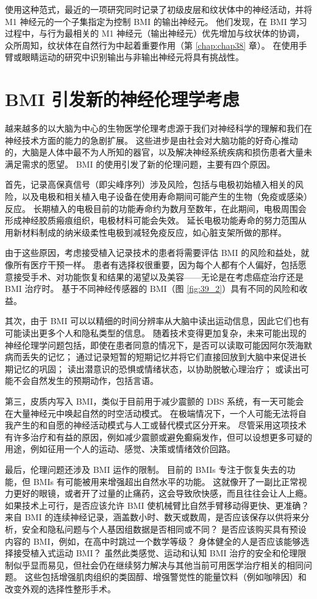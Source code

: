使用这种范式，最近的一项研究同时记录了初级皮层和纹状体中的神经活动，并将 M1 神经元的一个子集指定为控制 BMI 的输出神经元。 
他们发现，在 BMI 学习过程中，与行为最相关的 M1 神经元（输出神经元）优先增加与纹状体的协调，众所周知，纹状体在自然行为中起着重要作用（第 \ref{chap:chap38} 章）。 
在使用手臂或眼睛运动的研究中识别输出与非输出神经元将具有挑战性。


\section{BMI 引发新的神经伦理学考虑}

越来越多的以大脑为中心的生物医学伦理考虑源于我们对神经科学的理解和我们在神经技术方面的能力的急剧扩展。
这些进步是由社会对大脑功能的好奇心推动的，大脑是人体中最不为人所知的器官，以及解决神经系统疾病和损伤患者大量未满足需求的愿望。
BMI 的使用引发了新的伦理问题，主要有四个原因。


首先，记录高保真信号（即尖峰序列）涉及风险，包括与电极初始植入相关的风险，以及电极和相关植入电子设备在使用寿命期间可能产生的生物（免疫或感染）反应。
长期植入的电极目前的功能寿命约为数月至数年，在此期间，电极周围会形成神经胶质瘢痕组织，电极材料可能会失效。
延长电极功能寿命的努力范围从用新材料制成的纳米级柔性电极到减轻免疫反应，如心脏支架所做的那样。


由于这些原因，考虑接受植入记录技术的患者将需要评估 BMI 的风险和益处，就像所有医疗干预一样。
患者有选择权很重要，因为每个人都有个人偏好，包括愿意接受手术、对功能恢复和结果的渴望以及美容——无论是在考虑癌症治疗还是 BMI 治疗时。
基于不同神经传感器的 BMI（图 \ref{fig:39_2}）具有不同的风险和收益。


其次，由于 BMI 可以以精细的时间分辨率从大脑中读出运动信息，因此它们也有可能读出更多个人和隐私类型的信息。
随着技术变得更加复杂，未来可能出现的神经伦理学问题包括，即使在患者同意的情况下，是否可以读取可能因阿尔茨海默病而丢失的记忆；
通过记录短暂的短期记忆并将它们直接回放到大脑中来促进长期记忆的巩固；
读出潜意识的恐惧或情绪状态，以协助脱敏心理治疗；
或读出可能不会自然发生的预期动作，包括言语。


第三，皮质内写入 BMI，类似于目前用于减少震颤的 DBS 系统，有一天可能会在大量神经元中唤起自然的时空活动模式。
在极端情况下，一个人可能无法将自我产生的和自愿的神经活动模式与人工或替代模式区分开来。
尽管采用这项技术有许多治疗和有益的原因，例如减少震颤或避免癫痫发作，但可以设想更多可疑的用途，例如征用一个人的运动、感觉、决策或情绪效价回路。


最后，伦理问题还涉及 BMI 运作的限制。
目前的 BMIs 专注于恢复失去的功能，但 BMIs 有可能被用来增强超出自然水平的功能。
这就像开了一副比正常视力更好的眼镜，或者开了过量的止痛药，这会导致欣快感，而且往往会让人上瘾。
如果技术上可行，是否应该允许 BMI 使机械臂比自然手臂移动得更快、更准确？
来自 BMI 的连续神经记录，涵盖数小时、数天或数周，是否应该保存以供将来分析，安全和隐私问题与个人基因组数据是否相同或不同？
是否应该购买具有预设内容的 BMI，例如，在高中时跳过一个数学等级？
身体健全的人是否应该能够选择接受植入式运动 BMI？ 
虽然此类感觉、运动和认知 BMI 治疗的安全和伦理限制似乎显而易见，但社会仍在继续努力解决与其他当前可用医学治疗相关的相同问题。
这些包括增强肌肉组织的类固醇、增强警觉性的能量饮料（例如咖啡因）和改变外观的选择性整形手术。


